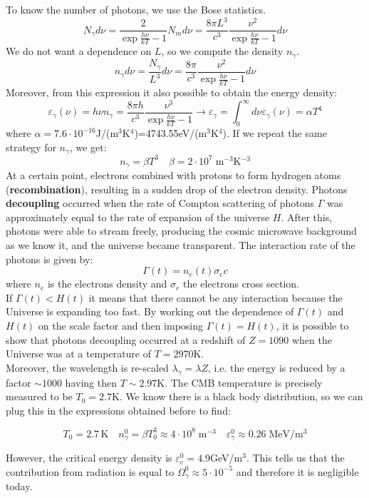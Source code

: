 \documentclass[10.75pt,a4paper,openright,bottom=2cm]{article}
\newcommand{\beginbox}[1]{\begin{tcolorbox}[width=\textwidth,colback={black!40},title={#1},colbacktitle={purple!55},coltitle=black]}
\renewcommand{\endbox}{\end{tcolorbox}\noindent}
\begin{document}
To know the number of photons, we use the Bose statistics.
\[
N_\gamma d\nu=\frac{2}{\exp{\frac{h\nu}{kT}}-1}N_md\nu=\frac{8\pi L^3}{c^3}\frac{\nu^2}{\exp{\frac{h\nu}{kT}}-1}d\nu
\]
We do not want a dependence on $L$, so we compute the density $n_\gamma$.
\[
n_\gamma d\nu=\frac{N_\gamma}{L^3}d\nu=\frac{8\pi}{c^3}\frac{\nu^2}{\exp{\frac{h\nu}{kT}}-1}d\nu
\]
Moreover, from this expression it also possible to obtain the energy density:
\[
\varepsilon_\gamma(\nu)=h\nu n_\gamma=\frac{8\pi h}{c^3}\frac{\nu^3}{\exp{\frac{h\nu}{kT}}-1}\to\varepsilon_\gamma=\int_0^\infty d\nu\varepsilon_\gamma(\nu)=\alpha T^4
\]
where $\alpha=7.6\cdot10^{-16}$\;J/(m$^3$K$^4$)=4743.55\;eV/(m$^3$K$^4$). If we repeat the same strategy for $n_\gamma$, we get:
\[
n_\gamma=\beta T^3 \quad \beta=2\cdot10^7\;\text{m$^{-3}$K$^{-3}$}
\]
At a certain point, electrons combined with protons to form hydrogen atoms (\textbf{recombination}), resulting in a sudden drop of the electron density. Photons \textbf{decoupling} occurred when the rate of Compton scattering of photons $\Gamma$ was approximately equal to the rate of expansion of the universe $H$. After this, photons were able to stream freely, producing the cosmic microwave background as we know it, and the universe became transparent. The interaction rate of the photons is given by:
\[
\Gamma(t)=n_e(t)\sigma_ec
\]
where $n_e$ is the electrons density and $\sigma_e$ the electrons cross section.\\
If $\Gamma(t)<H(t)$ it means that there cannot be any interaction because the Universe is expanding too fast. By working out the dependence of $\Gamma(t)$ and $H(t)$ on the scale factor and then imposing $\Gamma(t)=H(t)$, it is possible to show that photons decoupling occurred at a redshift of $Z=1090$ when the Universe was at a temperature of $T=2970$\;K.\\
Moreover, the wavelength is re-scaled $\lambda_\gamma=\lambda Z$, i.e. the energy is reduced by a factor $\sim1000$ having then $T\sim2.97$\;K. The CMB temperature is precisely measured to be $T_0=2.7$\;K. We know there is a black body distribution, so we can plug this in the expressions obtained before to find:
\beginbox{Density of Photons}
\[
T_0=2.7\,\text{K}\quad n_\gamma^0=\beta T_0^3\approx4\cdot10^8\;\text{m$^{-3}$} \quad \varepsilon_\gamma^0\approx0.26\;\text{MeV/m$^3$}
\]
\endbox
However, the critical energy density is $\varepsilon_c^0=4.9$\;GeV/m$^3$. This tells us that the contribution from radiation is equal to $\Omega_\gamma^0\approx5\cdot10^{-5}$ and therefore it is negligible today.\\
\end{document}
